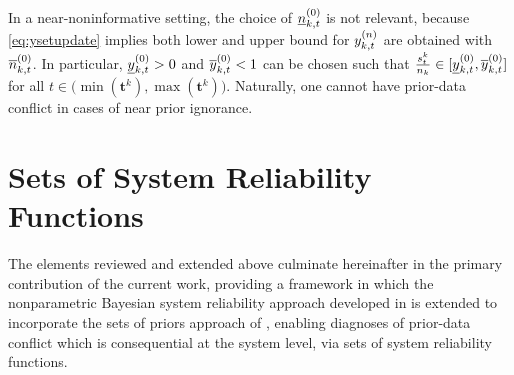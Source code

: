 \documentclass[12pt, a4paper]{elsarticle}
\newcommand{\bs}[1]{\boldsymbol{#1}}
\renewcommand{\vec}[1]{{\bs#1}}
\newcommand{\td}[1]{%
  \iftoggle{td}{%
    \todo[inline]{#1}%
  }{}%
}
\begin{document}
%
In a near-noninformative setting, the choice of $\underline{n}^{(0)}_{k,t}$ is not relevant,
because \eqref{eq:ysetupdate} implies both lower and upper bound for $y^{(n)}_{k,t}$ are obtained with $\overline{n}^{(0)}_{k,t}$.
In particular, $\underline{y}^{(0)}_{k,t} > 0$ and $\overline{y}^{(0)}_{k,t} < 1$ can be chosen such that
$\frac{s^k_t}{n_k} \in [\underline{y}^{(0)}_{k,t}, \overline{y}^{(0)}_{k,t}]$ for all $t \in \big(\min(\vec{t}^k), \max(\vec{t}^k)\big)$.
Naturally, one cannot have prior-data conflict in cases of near prior ignorance.


\section{Sets of System Reliability Functions}
\label{sec:setsofrel}

The elements reviewed and extended above culminate hereinafter in the primary contribution of the current work,
providing a framework in which the nonparametric Bayesian system reliability approach developed in \cite{2015:bayessurvsign}
is extended to incorporate the sets of priors approach of \citet{2009:WalterAugustin},
enabling diagnoses of prior-data conflict which is consequential at the system
level, via sets of system reliability functions.
\end{document}
